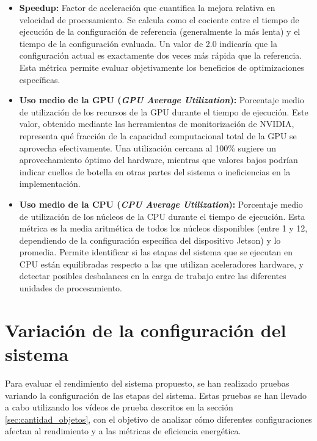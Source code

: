 \documentclass[11pt,spanish,listoffigures,listoftables]{tfgetsinf}
\begin{document}
\begin{itemize}
      \item \textbf{Speedup:} Factor de aceleración que cuantifica la mejora relativa en velocidad de procesamiento. Se calcula como el cociente entre el tiempo de ejecución de la configuración de referencia (generalmente la más lenta) y el tiempo de la configuración evaluada. Un valor de 2.0 indicaría que la configuración actual es exactamente dos veces más rápida que la referencia. Esta métrica permite evaluar objetivamente los beneficios de optimizaciones específicas.

      \item \textbf{Uso medio de la GPU (\textit{GPU Average Utilization}):} Porcentaje medio de utilización de los recursos de la GPU durante el tiempo de ejecución. Este valor, obtenido mediante las herramientas de monitorización de NVIDIA, representa qué fracción de la capacidad computacional total de la GPU se aprovecha efectivamente. Una utilización cercana al 100\% sugiere un aprovechamiento óptimo del hardware, mientras que valores bajos podrían indicar cuellos de botella en otras partes del sistema o ineficiencias en la implementación.

      \item \textbf{Uso medio de la CPU (\textit{CPU Average Utilization}):} Porcentaje medio de utilización de los núcleos de la CPU durante el tiempo de ejecución. Esta métrica es la media aritmética de todos los núcleos disponibles (entre 1 y 12, dependiendo de la configuración específica del dispositivo Jetson) y lo promedia. Permite identificar si las etapas del sistema que se ejecutan en CPU están equilibradas respecto a las que utilizan aceleradores hardware, y detectar posibles desbalances en la carga de trabajo entre las diferentes unidades de procesamiento.

\end{itemize}

\section{Variación de la configuración del sistema} \label{sec:variacion_configuracion}

Para evaluar el rendimiento del sistema propuesto, se han realizado pruebas variando la configuración de las etapas del sistema. Estas pruebas se han llevado a cabo utilizando los vídeos de prueba descritos en la sección \ref{sec:cantidad_objetos}, con el objetivo de analizar cómo diferentes configuraciones afectan al rendimiento y a las métricas de eficiencia energética.
\end{document}
